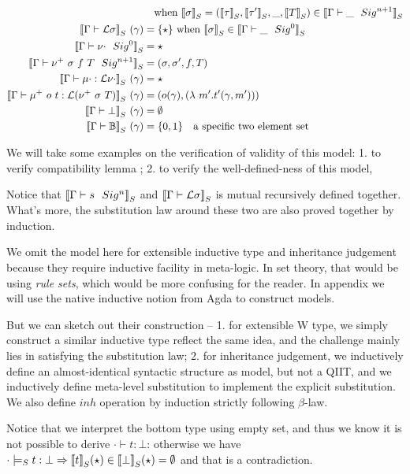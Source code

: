 \begin{align*}
  & \quad \text{when } \denotesS{\sigma} = (\denotesS{\tau}, \denotesS{\tau'}, \_ , \denotesS{T}) \in \denotesS{\goodSig{\Gamma}{\_}{n+1}} \\
  \denotesS{\goodType{\Gamma}{\cL \sigma}{i}} \ (\gamma)&= \{\star\} \text{ when } \denotesS{\sigma} \in \denotesS{\goodSig{\Gamma}{\_}{0}} \\
  \denotesS{\goodSig{\Gamma}{\nu\cdot}{0}} &= \star \\
  \denotesS{\goodSig{\Gamma}{\nu^+ \ \sigma \ f \ T}{n+1}} &= (\sigma, \sigma', f, T) \\
  \denotesS{\goodTerm{\Gamma}{\mu\cdot}{\cL \nu\cdot} } \ (\gamma) &= \star \\
  \denotesS{\goodTerm{\Gamma}{\mu^+ \ o \ t}{\cL(\nu^+ \ \sigma  \ T)}} \ (\gamma)&= (o(\gamma), (\lambda \ m' . t'(\gamma, m'))) \\
  \denotesS{\goodType{\Gamma}{\bot}{i}} \ (\gamma) &= \emptyset \\
  \denotesS{\goodType{\Gamma}{\cB}{i}} \ (\gamma) &= \{0, 1\} \quad \text{a specific two element set} \\
\end{align*}


We will take some examples on the verification of validity of this model: 1. to verify compatibility lemma ; 2. to verify the well-defined-ness of this model,  

Notice that $\denotesS{\goodSig{\Gamma}{s}{n}}$ and $\denotesS{\goodType{\Gamma}{\cL\sigma}{i}}$ is mutual recursively defined together. What's more, the substitution law around these two are also proved together by induction.

We omit the model here for extensible inductive type and inheritance judgement because they require inductive facility in meta-logic. In set theory, that would be using \textit{rule sets}\citep{timany2017consistency,aczel1998relating}, which would be more confusing for the reader. In appendix we will use the native inductive notion from Agda to construct models. 

But we can sketch out their construction -- 1. for extensible W type, we simply construct a similar inductive type reflect the same idea, and the challenge mainly lies in satisfying the substitution law; 2. for inheritance judgement, we inductively define an almost-identical syntactic structure as model, but not a QIIT, and we inductively define meta-level substitution to implement the explicit substitution. We also define $inh$ operation by induction strictly following $\beta$-law.



Notice that we interpret the bottom type using empty set, and thus we know it is not possible to derive $\cdot \vdash t : \bot$: otherwise we have $\cdot \models_S t : \bot \Rightarrow \denotesS{t}(\star) \in \denotesS{\bot}(\star) = \emptyset$ 
and that is a contradiction.
